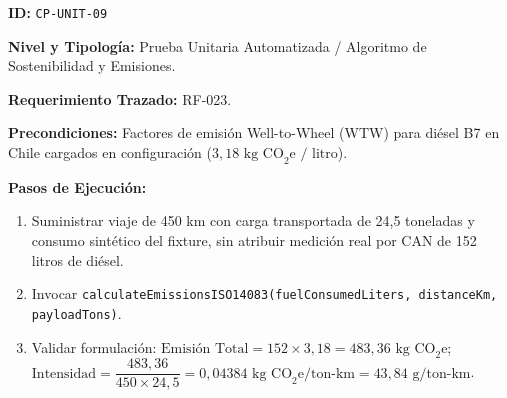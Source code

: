 \par\noindent\textbf{ID:} \texttt{C\allowbreak{}P\allowbreak{}-\allowbreak{}U\allowbreak{}N\allowbreak{}I\allowbreak{}T\allowbreak{}-\allowbreak{}0\allowbreak{}9\allowbreak{}}\par
\par\noindent\textbf{Nivel y Tipología:} Prueba Unitaria Automatizada / Algoritmo de Sostenibilidad y Emisiones.\par
\par\noindent\textbf{Requerimiento Trazado:} RF-023.\par
\par\noindent\textbf{Precondiciones:} Factores de emisión Well-to-Wheel (WTW) para diésel B7 en Chile cargados en configuración (\(3{,}18\text{ kg CO}_2\text{e / litro}\)).\par
\par\noindent\textbf{Pasos de Ejecución:} \par
\begin{enumerate}
\item Suministrar viaje de 450 km con carga transportada de 24,5 toneladas y consumo sintético del fixture, sin atribuir medición real por CAN de 152 litros de diésel.
\item Invocar \texttt{c\allowbreak{}a\allowbreak{}l\allowbreak{}c\allowbreak{}u\allowbreak{}l\allowbreak{}a\allowbreak{}t\allowbreak{}e\allowbreak{}E\allowbreak{}m\allowbreak{}i\allowbreak{}s\allowbreak{}s\allowbreak{}i\allowbreak{}o\allowbreak{}n\allowbreak{}s\allowbreak{}I\allowbreak{}S\allowbreak{}O\allowbreak{}1\allowbreak{}4\allowbreak{}0\allowbreak{}8\allowbreak{}3\allowbreak{}(\allowbreak{}f\allowbreak{}u\allowbreak{}e\allowbreak{}l\allowbreak{}C\allowbreak{}o\allowbreak{}n\allowbreak{}s\allowbreak{}u\allowbreak{}m\allowbreak{}e\allowbreak{}d\allowbreak{}L\allowbreak{}i\allowbreak{}t\allowbreak{}e\allowbreak{}r\allowbreak{}s\allowbreak{},\allowbreak{} d\allowbreak{}i\allowbreak{}s\allowbreak{}t\allowbreak{}a\allowbreak{}n\allowbreak{}c\allowbreak{}e\allowbreak{}K\allowbreak{}m\allowbreak{},\allowbreak{} p\allowbreak{}a\allowbreak{}y\allowbreak{}l\allowbreak{}o\allowbreak{}a\allowbreak{}d\allowbreak{}T\allowbreak{}o\allowbreak{}n\allowbreak{}s\allowbreak{})\allowbreak{}}.
\item Validar formulación: \(\text{Emisión Total} = 152 \times 3{,}18 = 483{,}36\text{ kg CO}_2\text{e}\); \(\text{Intensidad} = \dfrac{483{,}36}{450 \times 24{,}5} = 0{,}04384\text{ kg CO}_2\text{e/ton-km} = 43{,}84\text{ g/ton-km}\).
\end{enumerate}
